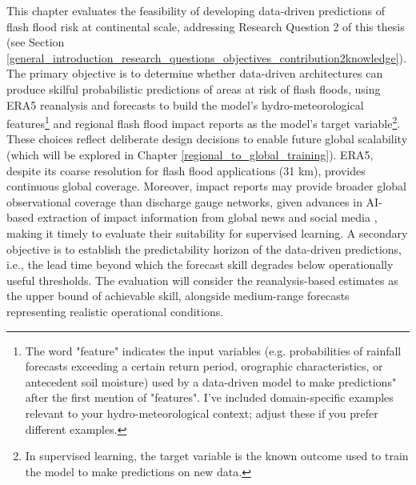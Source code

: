 This  chapter evaluates the feasibility of developing data-driven predictions of flash flood risk at continental scale, addressing Research Question 2 of this thesis (see Section \ref{general_introduction_research_questions_objectives_contribution2knowledge}). The primary objective is to determine whether data-driven architectures can produce skilful probabilistic predictions of areas at risk of flash floods, using ERA5 reanalysis and forecasts to build the model's hydro-meteorological features\footnote{The word "feature" indicates the input variables (e.g. probabilities of rainfall forecasts exceeding a certain return period, orographic characteristics, or antecedent soil moisture) used by a data-driven model to make predictions" after the first mention of "features". I've included domain-specific examples relevant to your hydro-meteorological context; adjust these if you prefer different examples.} and regional flash flood impact reports as the model's target variable\footnote{In supervised learning, the target variable is the known outcome used to train the model to make predictions on new data.}. These choices reflect deliberate design decisions to enable future global scalability (which will be explored in Chapter \ref{regional_to_global_training}). ERA5, despite its coarse resolution for flash flood applications (31 km), provides continuous global coverage. Moreover, impact reports may provide broader global observational coverage than discharge gauge networks, given advances in AI-based extraction of impact information from global news and social media \citep{Robbins_2018, Spruce_2021, Wyatt_2023}, making it timely to evaluate their suitability for supervised learning. A secondary objective is to establish the predictability horizon of the data-driven predictions, i.e., the lead time beyond which the forecast skill degrades below operationally useful thresholds. The evaluation will consider the reanalysis-based estimates as the upper bound of achievable skill, alongside medium-range forecasts representing realistic operational conditions.

